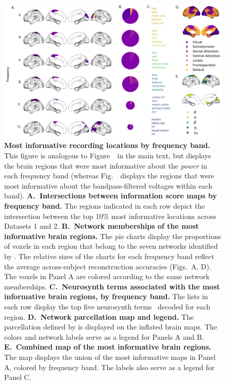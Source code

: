 \documentclass[10pt]{article}
\begin{document}
\begin{figure}[p]
\centering \includegraphics[width=\textwidth]{figs/supplemental_5}
\caption{\textbf{Most informative recording locations by frequency band.} This
figure is analogous to Figure~\infomapfreqs~in the main text, but displays the
brain regions that were most informative about the \textit{power} in each
frequency band (whereas Fig.~\infomapfreqs~displays the regions that were most
informative about the bandpass-filtered voltages within each band).
\textbf{A.~Intersections between information score maps by frequency band.} The
regions indicated in each row depict the intersection between the top 10\% most
informative locations across Datasets 1 and 2.  \textbf{B.~Network memberships
of the most informative brain regions.}  The pie charts display the proportions
of voxels in each region that belong to the seven networks identified by
\cite{YeoEtal11}.  The relative sizes of the charts for each frequency band
reflect the average across-subject reconstruction accuracies
(Figs.~\freqs A, D).  The voxels in Panel A are colored according to
the same network memberships.  \textbf{C.~Neurosynth terms associated with the
most informative brain regions, by frequency band.}  The lists in each row
display the top five neurosynth terms~\citep{RubiEtal17} decoded for each
region.  \textbf{D.~Network parcellation map and legend.}  The parcellation
defined by \cite{YeoEtal11} is displayed on the inflated brain maps.  The colors
and network labels serve as a legend for Panels A and B. \textbf{E.~Combined map
of the most informative brain regions.}  The map displays the union of the most
informative maps in Panel A, colored by frequency band.  The labels also serve
as a legend for Panel C.}
\label{fig:supplemental_5}
\end{figure}
\end{document}

